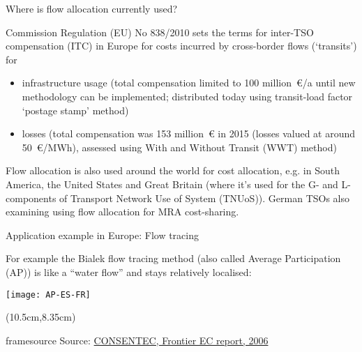 \documentclass[10pt,aspectratio=169,dvipsnames]{beamer}
\newcommand{\source}[1]{\begin{textblock*}{5cm}(10.5cm,8.35cm)
    \begin{beamercolorbox}[ht=0.5cm,right]{framesource}
        \usebeamerfont{framesource}\usebeamercolor[fg]{framesource} Source: {#1}
    \end{beamercolorbox}
\end{textblock*}}
\let\olditem\item
\renewcommand{\item}{%
\olditem\vspace{5pt}}
\begin{document}
\begin{frame}{Where is flow allocation currently used?}

  Commission Regulation (EU) No 838/2010 sets the terms for inter-TSO compensation (ITC) in Europe for costs incurred by
  cross-border flows (`transits') for
  \begin{itemize}
  \item \alert{infrastructure usage} (total compensation limited to 100
    million~\euro/a until new methodology can be implemented; distributed today using
    transit-load factor `postage stamp' method)
  \item \alert{losses} (total compensation was 153 million~\euro{} in 2015 (losses valued at around 50~\euro/MWh),  assessed using With and Without Transit (WWT) method)
  \end{itemize}

  Flow allocation is also used around the world for cost allocation,
  e.g. in South America, the United States and Great Britain (where it's used for
  the G- and L-components of Transport Network Use of System (TNUoS)). German TSOs also examining using flow allocation for
  MRA cost-sharing.




\end{frame}



\begin{frame}{Application example in Europe: Flow tracing}

  For example the Bialek \alert{flow tracing method} (also called Average
  Participation (AP)) is like a ``water flow'' and stays relatively
  \alert{localised}:

  \vspace{.3cm}

  \centering
  \texttt{[image: AP-ES-FR]}

    \source{\href{https://ec.europa.eu/energy/sites/ener/files/documents/2006_03_tso_compensation_mechanism.pdf}{CONSENTEC, Frontier EC report, 2006}}

\end{frame}
\end{document}
